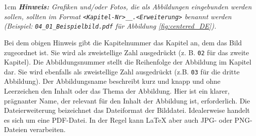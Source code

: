 \begin{addmargin}[1cm]{1cm}
	\textit{\textbf{Hinweis:} Grafiken und/oder Fotos, die als Abbildungen eingebunden werden sollen, sollten im Format \texttt{<Kapitel-Nr>\_<Abbildungs-Nr>\_<Abbildungs-Name>.<Erweiterung>} benannt werden (Beispiel: \texttt{04\_01\_Beispielbild.pdf} für Abbildung \ref{fig:centered_DE}).}
\end{addmargin}

Bei dem obigen Hinweis gibt die Kapitelnummer das Kapitel an, dem das Bild zugeordnet ist. Sie wird als zweistellige Zahl ausgedrückt (z. B. \texttt{02} für das zweite Kapitel). Die Abbildungsnummer stellt die Reihenfolge der Abbildung im Kapitel dar. Sie wird ebenfalls als zweistellige Zahl ausgedrückt (z.B. \texttt{03} für die dritte Abbildung). Der Abbildungsname beschreibt kurz und knapp und ohne Leerzeichen den Inhalt oder das Thema der Abbildung. Hier ist ein klarer, prägnanter Name, der relevant für den Inhalt der Abbildung ist, erforderlich. Die Dateierweiterung beizeichnet das Dateiformat der Bilddatei. Idealerweise handelt es sich um eine PDF-Datei. In der Regel kann \LaTeX{} aber auch JPG- oder PNG-Dateien verarbeiten.
